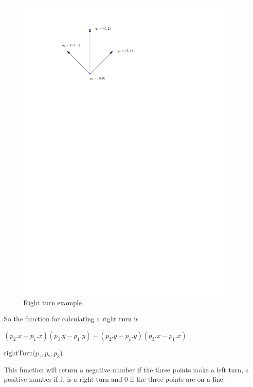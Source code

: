 \begin{figure}[H]
    \centering
	\includegraphics{figures/rightturn3.pdf}
	\caption{Right turn example}
    \label{rightturn3}
\end{figure}

So the function for calculating a right turn is

\begin{algorithm} 
	\begin{algorithmic}[1] 
		\State \Return $(p_2.x-p_1.x)(p_3.y-p_1.y)-(p_2.y-p_1.y)(p_3.x-p_1.x)$
	\end{algorithmic}
	\caption{rightTurn($p_1,p_2,p_3$)}
\end{algorithm}

This function will return a negative number if the three points make a left
turn, a positive number if it is a right turn and 0 if the three points are on
a line.

